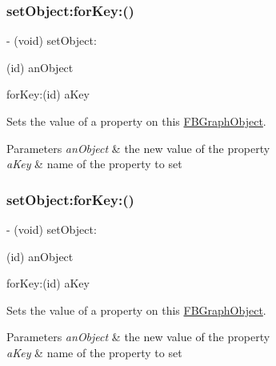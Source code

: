 \subsubsection{\texorpdfstring{set\+Object\+:for\+Key\+:()}{setObject:forKey:()}\hspace{0.1cm}{\footnotesize\ttfamily [3/5]}}
{\footnotesize\ttfamily -\/ (void) set\+Object\+: \begin{DoxyParamCaption}\item[{(id)}]{an\+Object }\item[{forKey:(id)}]{a\+Key }\end{DoxyParamCaption}}

Sets the value of a property on this {\ttfamily \hyperlink{interfaceFBGraphObject}{F\+B\+Graph\+Object}}.


\begin{DoxyParams}{Parameters}
{\em an\+Object} & the new value of the property \\
\hline
{\em a\+Key} & name of the property to set \\
\hline
\end{DoxyParams}
\mbox{\label{protocolFBGraphObject-p_a9b7573bc6e372ff8f4f33c3d144ea620}} 
\subsubsection{\texorpdfstring{set\+Object\+:for\+Key\+:()}{setObject:forKey:()}\hspace{0.1cm}{\footnotesize\ttfamily [4/5]}}
{\footnotesize\ttfamily -\/ (void) set\+Object\+: \begin{DoxyParamCaption}\item[{(id)}]{an\+Object }\item[{forKey:(id)}]{a\+Key }\end{DoxyParamCaption}}

Sets the value of a property on this {\ttfamily \hyperlink{interfaceFBGraphObject}{F\+B\+Graph\+Object}}.


\begin{DoxyParams}{Parameters}
{\em an\+Object} & the new value of the property \\
\hline
{\em a\+Key} & name of the property to set \\
\hline
\end{DoxyParams}
\mbox{\label{protocolFBGraphObject-p_a9b7573bc6e372ff8f4f33c3d144ea620}} 
